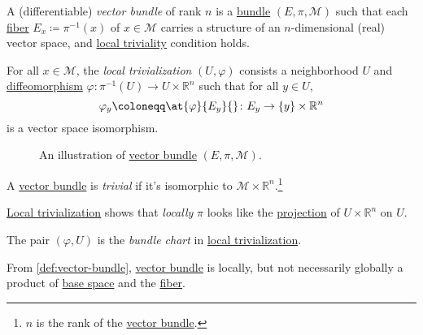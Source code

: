 \begin{definition}\label{def:vector-bundle}
	A (differentiable) \emph{vector bundle} of rank \(n\) is a \hyperref[def:bundle]{bundle} \((E, \pi , \mathcal{M} )\) such that each \hyperref[def:fiber]{fiber} \(E_x\coloneqq \pi ^{-1} (x)\) of \(x\in \mathcal{M} \) carries a structure of an \(n\)-dimensional (real) vector space, and \hyperref[def:local-trivialization]{local triviality} condition holds.

	\begin{definition}\label{def:local-trivialization}
		For all \(x\in \mathcal{M} \), the \emph{local trivialization} \((U, \varphi )\) consists a neighborhood \(U\) and \hyperref[def:diffeomorphism]{diffeomorphism} \(\varphi \colon \pi ^{-1} (U) \to U\times \mathbb{R} ^n\) such that for all \(y\in U\),
		\[
			\varphi _y \coloneqq \at{\varphi }{E_y}{} \colon E_y \to \left\{ y \right\} \times \mathbb{R} ^n
		\]
		is a vector space isomorphism.
	\end{definition}
\end{definition}

\begin{figure}[H]
	\centering
	\caption{An illustration of \hyperref[def:vector-bundle]{vector bundle} \((E, \pi , \mathcal{M} )\).}
	\label{fig:vector-bundle}
\end{figure}

\begin{definition}[Trivial]\label{def:trivial}
	A \hyperref[def:vector-bundle]{vector bundle} is \emph{trivial} if it's isomorphic to \(\mathcal{M} \times \mathbb{R} ^n\).\footnote{\(n\) is the rank of the \hyperref[def:vector-bundle]{vector bundle}.}
\end{definition}

\begin{intuition}
	\hyperref[def:local-trivialization]{Local trivialization} shows that \emph{locally} \(\pi \) looks like the \hyperref[def:bundle-projection]{projection} of \(U\times \mathbb{R} ^n\) on \(U\).
\end{intuition}

\begin{definition}\label{def:bundle-chart}
	The pair \((\varphi , U)\) is the \emph{bundle chart} in \hyperref[def:local-trivialization]{local trivialization}.
\end{definition}

\begin{remark}
	From \autoref{def:vector-bundle}, \hyperref[def:vector-bundle]{vector bundle} is locally, but not necessarily globally a product of \hyperref[def:base-space]{base space} and the \hyperref[def:fiber]{fiber}.
\end{remark}

